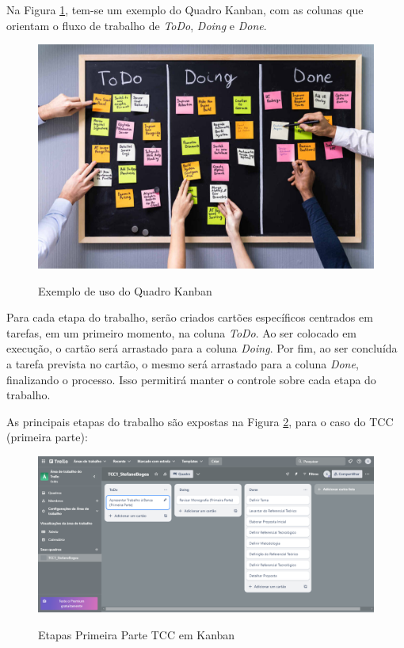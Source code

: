 Na Figura \ref{kanban}, tem-se um exemplo do Quadro Kanban, com as colunas que orientam o fluxo de trabalho de \textit{ToDo}, \textit{Doing} e \textit{Done}.

\begin{figure}[ht]
    \centering
    \caption{Exemplo de uso do Quadro Kanban}
    \includegraphics[keepaspectratio=true,scale=1.2]{figuras/kanban.jpg}
    \label{kanban}
\end{figure}

Para cada etapa do trabalho, serão criados cartões específicos centrados em tarefas, em um primeiro momento, na coluna \textit{ToDo}. Ao ser colocado em execução, o cartão será arrastado para a coluna \textit{Doing}. Por fim, ao ser concluída a tarefa prevista no cartão, o mesmo será arrastado para a coluna \textit{Done}, finalizando o processo. Isso permitirá manter o controle sobre cada etapa do trabalho.

As principais etapas do trabalho são expostas na Figura \ref{kanbanmeu}, para o caso do TCC (primeira parte):

\begin{figure}[ht]
    \centering
    \caption{Etapas Primeira Parte TCC em Kanban}
    \includegraphics[keepaspectratio=true,scale=0.4]{figuras/kanbanmeu.png}
    \label{kanbanmeu}
\end{figure}

